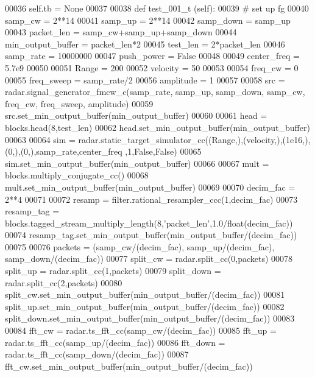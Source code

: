 \begin{DoxyCode}
00036         self.tb = \textcolor{keywordtype}{None}
00037 
00038     \textcolor{keyword}{def }test_001_t (self):
00039         \textcolor{comment}{# set up fg}
00040         samp\_cw = 2**14
00041         samp\_up = 2**14
00042         samp\_down = samp\_up
00043         packet\_len = samp\_cw+samp\_up+samp\_down
00044         min\_output\_buffer = packet\_len*2
00045         test\_len = 2*packet\_len
00046         samp\_rate = 10000000
00047         push\_power = \textcolor{keyword}{False}
00048         
00049         center\_freq = 5.7e9
00050         
00051         Range = 200
00052         velocity = 50
00053         
00054         freq\_cw = 0
00055         freq\_sweep = samp\_rate/2
00056         amplitude = 1
00057 
00058         src = radar.signal\_generator\_fmcw\_c(samp\_rate, samp\_up, samp\_down, samp\_cw, freq\_cw, freq\_sweep, 
      amplitude)
00059         src.set\_min\_output\_buffer(min\_output\_buffer)
00060         
00061         head = blocks.head(8,test\_len)
00062         head.set\_min\_output\_buffer(min\_output\_buffer)
00063         
00064         sim = radar.static\_target\_simulator\_cc((Range,),(velocity,),(1e16,),(0,),(0,),samp\_rate,center\_freq
      ,1,\textcolor{keyword}{False},\textcolor{keyword}{False})
00065         sim.set\_min\_output\_buffer(min\_output\_buffer)
00066         
00067         mult = blocks.multiply\_conjugate\_cc()
00068         mult.set\_min\_output\_buffer(min\_output\_buffer)
00069         
00070         decim\_fac = 2**4
00071         
00072         resamp = filter.rational\_resampler\_ccc(1,decim\_fac)
00073         resamp\_tag = blocks.tagged\_stream\_multiply\_length(8,\textcolor{stringliteral}{'packet\_len'},1.0/float(decim\_fac))
00074         resamp\_tag.set\_min\_output\_buffer(min\_output\_buffer/(decim\_fac))
00075         
00076         packets = (samp\_cw/(decim\_fac), samp\_up/(decim\_fac), samp\_down/(decim\_fac))
00077         split\_cw = radar.split\_cc(0,packets)
00078         split\_up = radar.split\_cc(1,packets)
00079         split\_down = radar.split\_cc(2,packets)
00080         split\_cw.set\_min\_output\_buffer(min\_output\_buffer/(decim\_fac))
00081         split\_up.set\_min\_output\_buffer(min\_output\_buffer/(decim\_fac))
00082         split\_down.set\_min\_output\_buffer(min\_output\_buffer/(decim\_fac))
00083         
00084         fft\_cw = radar.ts\_fft\_cc(samp\_cw/(decim\_fac))
00085         fft\_up = radar.ts\_fft\_cc(samp\_up/(decim\_fac))
00086         fft\_down = radar.ts\_fft\_cc(samp\_down/(decim\_fac))
00087         fft\_cw.set\_min\_output\_buffer(min\_output\_buffer/(decim\_fac))

\end{DoxyCode}
